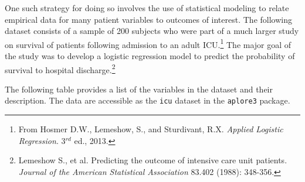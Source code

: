 \documentclass[
]{article}
\begin{document}
One such strategy for doing so involves the use of statistical modeling
to relate empirical data for many patient variables to outcomes of
interest. The following dataset consists of a sample of 200 subjects who
were part of a much larger study on survival of patients following
admission to an adult
ICU.\footnote{From Hosmer D.W., Lemeshow, S., and Sturdivant, R.X. \textit{Applied Logistic Regression}. 3$^{rd}$ ed., 2013.}
The major goal of the study was to develop a logistic regression model
to predict the probability of survival to hospital
discharge.\footnote{Lemeshow S., et al. Predicting the outcome of intensive care unit patients. \textit{Journal of the American Statistical Association} 83.402 (1988): 348-356.}

The following table provides a list of the variables in the dataset and
their description. The data are accessible as the \texttt{icu} dataset
in the \texttt{aplore3} package.
\end{document}
